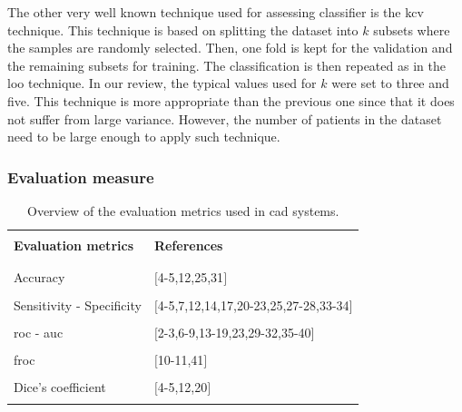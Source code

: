 The other very well known technique used for assessing classifier is the \acf{kcv} technique. This technique is based on splitting the dataset into $k$ subsets where the samples are randomly selected. Then, one fold is kept for the validation and the remaining subsets for training. The classification is then repeated as in the \ac{loo} technique. In our review, the typical values used for $k$ were set to three and five. This technique is more appropriate than the previous one since that it does not suffer from large variance. However, the number of patients in the dataset need to be large enough to apply such technique.

\subsubsection{Evaluation measure}\label{subsubsec:eval}

\begin{table}
	\caption{Overview of the evaluation metrics used in \ac{cad} systems.}
	\small
	\begin{tabular}{p{.55\linewidth} p{.35\linewidth}}
		\hline \\ [-1.5ex]
		\textbf{Evaluation metrics} & \textbf{References} \\ \\ [-1.5ex]
		\hline \\ [-1.5ex]
		\quad Accuracy & $[$4-5,12,25,31$]$ \\ \\ [-1.5ex]
		\quad Sensitivity - Specificity & $[$4-5,7,12,14,17,20-23,25,27-28,33-34$]$ \\ \\ [-1.5ex]
		\quad \acs{roc} - \acs{auc} & $[$2-3,6-9,13-19,23,29-32,35-40$]$ \\ \\ [-1.5ex]
		\quad \acs{froc} & $[$10-11,41$]$ \\ \\ [-1.5ex]
		\quad Dice's coefficient & $[$4-5,12,20$]$ \\ \\ [-1.5ex]
		\hline
	\end{tabular}
	\label{tab:evatec}
\end{table}

